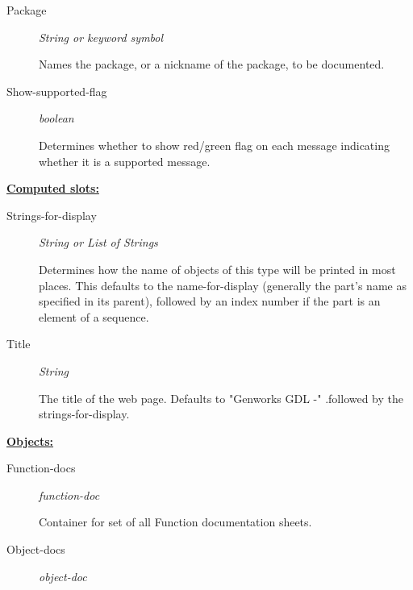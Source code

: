 \documentclass [11pt]{book}
\begin{document}
\begin{itemize}
\begin{description}
\item [Package]
\emph{String or keyword symbol}

 Names the package, or a nickname of the package, to be documented.




\item [Show-supported-flag]
\emph{boolean}

 Determines whether to show red/green flag on each message indicating whether it is a
supported message.




\end{description}






\textbf{
\underline{Computed slots:}}

\begin{description}

\item [Strings-for-display]
\emph{String or List of Strings}

 Determines how the name of objects of this type will be printed in most places.
This defaults to the name-for-display (generally the part's name as specified in its
parent), followed by an index number if the part is an element of a sequence.




\item [Title]
\emph{String}

 The title of the web page. Defaults to "Genworks GDL -"
.followed by the strings-for-display.




\end{description}






\textbf{
\underline{Objects:}}

\begin{description}

\item [Function-docs]
\emph{function-doc}

 Container for set of all Function documentation sheets.




\item [Object-docs]
\emph{object-doc}


\end{description}
\end{itemize}
\end{document}
